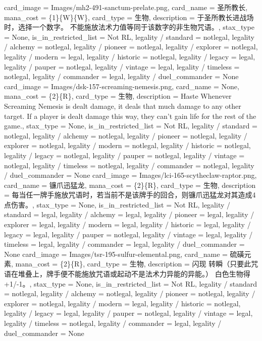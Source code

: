 \documentclass[lang = cn, color = black, 10pt]{AllThatStax}
\begin{document}
\card
{
	card_image = Images/mh2-491-sanctum-prelate.png,
	card_name = 圣所教长,
	mana_cost = \{1\}\{W\}\{W\},
	card_type = 生物,
	description = 于圣所教长进战场时，选择一个数字。
	不能施放法术力值等同于该数字的非生物咒语。,
	stax_type = None,
	is_in_restricted_list = Not RL,
	legality / standard = notlegal,
	legality / alchemy = notlegal,
	legality / pioneer = notlegal,
	legality / explorer = notlegal,
	legality / modern = legal,
	legality / historic = notlegal,
	legality / legacy = legal,
	legality / pauper = notlegal,
	legality / vintage = legal,
	legality / timeless = notlegal,
	legality / commander = legal,
	legality / duel_commander = None
}
\card
{
	card_image = Images/dsk-157-screaming-nemesis.png,
	card_name = None,
	mana_cost = \{2\}\{R\},
	card_type = 生物,
	description = Haste
	Whenever Screaming Nemesis is dealt damage, it deals that much damage to any other target. If a player is dealt damage this way, they can't gain life for the rest of the game.,
	stax_type = None,
	is_in_restricted_list = Not RL,
	legality / standard = notlegal,
	legality / alchemy = notlegal,
	legality / pioneer = notlegal,
	legality / explorer = notlegal,
	legality / modern = notlegal,
	legality / historic = notlegal,
	legality / legacy = notlegal,
	legality / pauper = notlegal,
	legality / vintage = notlegal,
	legality / timeless = notlegal,
	legality / commander = notlegal,
	legality / duel_commander = None
}
\card
{
	card_image = Images/lci-165-scytheclaw-raptor.png,
	card_name = 镰爪迅猛龙,
	mana_cost = \{2\}\{R\},
	card_type = 生物,
	description = 每当任一牌手施放咒语时，若当前不是该牌手的回合，则镰爪迅猛龙对其造成4点伤害。,
	stax_type = None,
	is_in_restricted_list = Not RL,
	legality / standard = legal,
	legality / alchemy = legal,
	legality / pioneer = legal,
	legality / explorer = legal,
	legality / modern = legal,
	legality / historic = legal,
	legality / legacy = legal,
	legality / pauper = notlegal,
	legality / vintage = legal,
	legality / timeless = legal,
	legality / commander = legal,
	legality / duel_commander = None
}
\card
{
	card_image = Images/tsr-195-sulfur-elemental.png,
	card_name = 硫磺元素,
	mana_cost = \{2\}\{R\},
	card_type = 生物,
	description = 闪现
	转瞬（只要此咒语在堆叠上，牌手便不能施放咒语或起动不是法术力异能的异能。）
	白色生物得+1/-1。,
	stax_type = None,
	is_in_restricted_list = Not RL,
	legality / standard = notlegal,
	legality / alchemy = notlegal,
	legality / pioneer = notlegal,
	legality / explorer = notlegal,
	legality / modern = legal,
	legality / historic = notlegal,
	legality / legacy = legal,
	legality / pauper = notlegal,
	legality / vintage = legal,
	legality / timeless = notlegal,
	legality / commander = legal,
	legality / duel_commander = None
}
\end{document}
